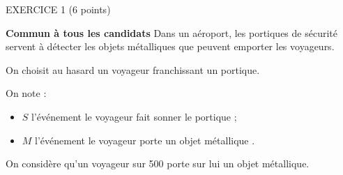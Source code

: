 
\begin{h2}EXERCICE 1 (6 points)\end{h2}
\textbf{Commun à  tous les candidats}
\medskip
Dans un aéroport, les portiques de sécurité servent à détecter les objets métalliques que peuvent emporter les voyageurs.
\par
On choisit au hasard un voyageur franchissant un portique.
\par
On note :
\begin{itemize}
     \item $S$ l'événement \og le voyageur fait sonner le portique \fg{};
     \item $M$ l'événement \og le voyageur porte un objet métallique \fg{}.
\end{itemize}
On considère qu'un voyageur sur 500 porte sur lui un objet métallique.
